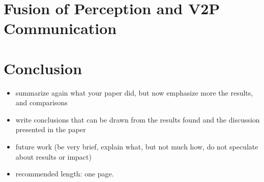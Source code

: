 \documentclass[]{ccs-thesis}
\begin{document}

\chapter{Fusion of Perception and V2P Communication}
\label{chap:fusion}




\chapter{Conclusion}
\label{chap:conclusion}


\begin{itemize}
\item summarize again what your paper did, but now emphasize more the results, and comparisons
\item write conclusions that can be drawn from the results found and the discussion presented in the paper
\item future work (be very brief, explain what, but not much how, do not speculate about results or impact)
\item recommended length: one page.
\end{itemize}



\cleardoublepage

\listofabbreviations
\clearpage

\listoffigures
\clearpage


\printbibliography
\end{document}

